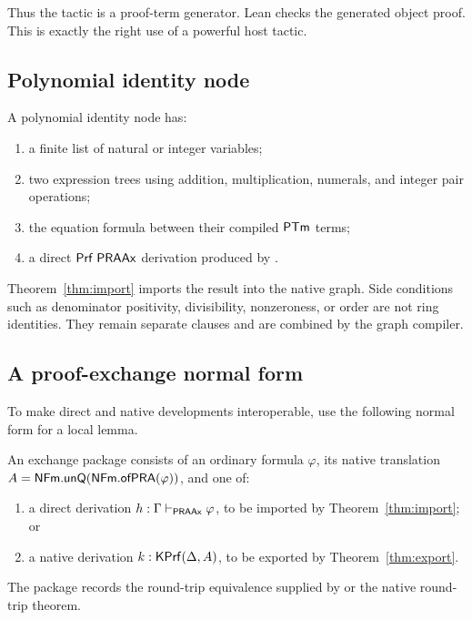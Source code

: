 Thus the tactic is a proof-term generator.  Lean checks the generated object
proof.  This is exactly the right use of a powerful host tactic.

\subsection{Polynomial identity node}

A polynomial identity node has:

\begin{enumerate}
\item a finite list of natural or integer variables;
\item two expression trees using addition, multiplication, numerals, and
integer pair operations;
\item the equation formula between their compiled \(\mathsf{PTm}\) terms;
\item a direct \(\mathsf{Prf}\;\mathsf{PRAAx}\) derivation produced by .
\end{enumerate}

Theorem~\ref{thm:import} imports the result into the native graph.  Side
conditions such as denominator positivity, divisibility, nonzeroness, or order
are not ring identities.  They remain separate clauses and are combined by the
graph compiler.

\subsection{A proof-exchange normal form}

To make direct and native developments interoperable, use the following normal
form for a local lemma.

\begin{definition}
An exchange package consists of an ordinary formula \(\varphi\), its native
translation \(A=\mathsf{NFm}.\mathsf{unQ}(\mathsf{NFm}.\mathsf{ofPRA}(\varphi))\), and one of:
\begin{enumerate}
\item a direct derivation \(h:\Gamma\vdash_{\mathsf{PRAAx}}\varphi\), to be imported by
Theorem~\ref{thm:import}; or
\item a native derivation \(k:\mathsf{KPrf}(\Delta,A)\), to be exported by
Theorem~\ref{thm:export}.
\end{enumerate}
The package records the round-trip equivalence supplied by
 or the native round-trip theorem.
\end{definition}

